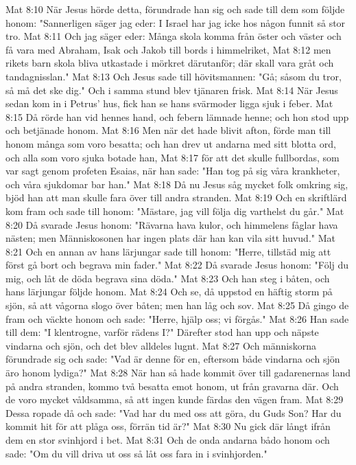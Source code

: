Mat 8:10  När Jesus hörde detta, förundrade han sig och sade till dem som följde honom: "Sannerligen säger jag eder: I Israel har jag icke hos någon funnit så stor tro.
Mat 8:11  Och jag säger eder: Många skola komma från öster och väster och få vara med Abraham, Isak och Jakob till bords i himmelriket,
Mat 8:12  men rikets barn skola bliva utkastade i mörkret därutanför; där skall vara gråt och tandagnisslan."
Mat 8:13  Och Jesus sade till hövitsmannen: "Gå; såsom du tror, så må det ske dig." Och i samma stund blev tjänaren frisk.
Mat 8:14  När Jesus sedan kom in i Petrus' hus, fick han se hans svärmoder ligga sjuk i feber.
Mat 8:15  Då rörde han vid hennes hand, och febern lämnade henne; och hon stod upp och betjänade honom.
Mat 8:16  Men när det hade blivit afton, förde man till honom många som voro besatta; och han drev ut andarna med sitt blotta ord, och alla som voro sjuka botade han,
Mat 8:17  för att det skulle fullbordas, som var sagt genom profeten Esaias, när han sade: "Han tog på sig våra krankheter, och våra sjukdomar bar han."
Mat 8:18  Då nu Jesus såg mycket folk omkring sig, bjöd han att man skulle fara över till andra stranden.
Mat 8:19  Och en skriftlärd kom fram och sade till honom: "Mästare, jag vill följa dig varthelst du går."
Mat 8:20  Då svarade Jesus honom: "Rävarna hava kulor, och himmelens fåglar hava nästen; men Människosonen har ingen plats där han kan vila sitt huvud."
Mat 8:21  Och en annan av hans lärjungar sade till honom: "Herre, tillstäd mig att först gå bort och begrava min fader."
Mat 8:22  Då svarade Jesus honom: "Följ du mig, och låt de döda begrava sina döda."
Mat 8:23  Och han steg i båten, och hans lärjungar följde honom.
Mat 8:24  Och se, då uppstod en häftig storm på sjön, så att vågorna slogo över båten; men han låg och sov.
Mat 8:25  Då gingo de fram och väckte honom och sade: "Herre, hjälp oss; vi förgås."
Mat 8:26  Han sade till dem: "I klentrogne, varför rädens I?" Därefter stod han upp och näpste vindarna och sjön, och det blev alldeles lugnt.
Mat 8:27  Och människorna förundrade sig och sade: "Vad är denne för en, eftersom både vindarna och sjön äro honom lydiga?"
Mat 8:28  När han så hade kommit över till gadarenernas land på andra stranden, kommo två besatta emot honom, ut från gravarna där. Och de voro mycket våldsamma, så att ingen kunde färdas den vägen fram.
Mat 8:29  Dessa ropade då och sade: "Vad har du med oss att göra, du Guds Son? Har du kommit hit för att plåga oss, förrän tid är?"
Mat 8:30  Nu gick där långt ifrån dem en stor svinhjord i bet.
Mat 8:31  Och de onda andarna bådo honom och sade: "Om du vill driva ut oss så låt oss fara in i svinhjorden."
